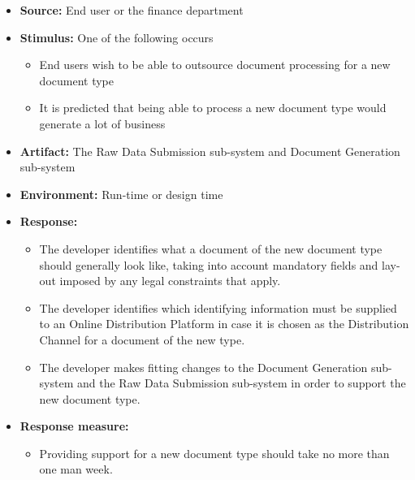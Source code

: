 \documentclass[a4paper,10pt]{article}
\begin{document}
\begin{itemize}
    \item \textbf{Source:} End user or the finance department
    \item \textbf{Stimulus:} One of the following occurs
        \begin{itemize}
            \item End users wish to be able to outsource document processing for a new document type
            \item It is predicted that being able to process a new document type would generate a lot of business
        \end{itemize}

    \item \textbf{Artifact:} The Raw Data Submission sub-system and Document Generation sub-system
    \item \textbf{Environment:} Run-time or design time
    \item \textbf{Response:}
        \begin{itemize}
            \item The developer identifies what a document of the new document type should generally look like, taking into account mandatory fields and lay-out imposed by any legal constraints that apply.
            \item The developer identifies which identifying information must be supplied to an Online Distribution Platform in case it is chosen as the Distribution Channel for a document of the new type.
            \item The developer makes fitting changes to the Document Generation sub-system and the Raw Data Submission sub-system in order to support the new document type.
        \end{itemize}

    \item \textbf{Response measure:}
        \begin{itemize}
            \item Providing support for a new document type should take no more than one man week.
        \end{itemize}
\end{itemize}
\end{document}
